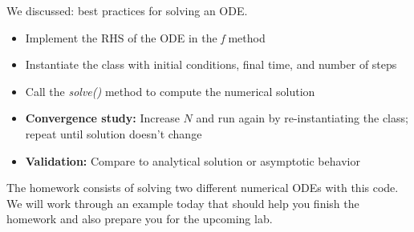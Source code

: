 \documentclass{beamer}
\begin{document}
\begin{frame}{We discussed: best practices for solving an ODE.}
  \begin{itemize}
    \item Implement the RHS of the ODE in the \textit{f} method
    \item Instantiate the class with initial conditions, final time, and number of steps
    \item Call the \textit{solve()} method to compute the numerical solution
    \item \textbf{Convergence study:} Increase $N$ and run again by re-instantiating the class; repeat until solution doesn't change
    \item \textbf{Validation:} Compare to analytical solution or asymptotic behavior
  \end{itemize}
  The homework consists of solving two different numerical ODEs with this code. We will work through an example today that should help you finish the homework and also prepare you for the upcoming lab.
\end{frame}
\end{document}
